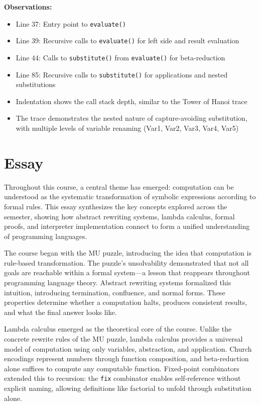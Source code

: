\documentclass{article}
\theoremstyle{theorem}
\theoremstyle{definition}
\theoremstyle{remark}
\begin{document}
\textbf{Observations:}

\begin{itemize}
\item Line 37: Entry point to \texttt{evaluate()}
\item Line 39: Recursive calls to \texttt{evaluate()} for left side and result evaluation
\item Line 44: Calls to \texttt{substitute()} from \texttt{evaluate()} for beta-reduction
\item Line 85: Recursive calls to \texttt{substitute()} for applications and nested substitutions
\item Indentation shows the call stack depth, similar to the Tower of Hanoi trace
\item The trace demonstrates the nested nature of capture-avoiding substitution, with multiple levels of variable renaming (Var1, Var2, Var3, Var4, Var5)
\end{itemize}

\section{Essay}

Throughout this course, a central theme has emerged: computation can be understood as the systematic transformation of symbolic expressions according to formal rules. This essay synthesizes the key concepts explored across the semester, showing how abstract rewriting systems, lambda calculus, formal proofs, and interpreter implementation connect to form a unified understanding of programming languages.

The course began with the MU puzzle, introducing the idea that computation is rule-based transformation. The puzzle's unsolvability demonstrated that not all goals are reachable within a formal system---a lesson that reappears throughout programming language theory. Abstract rewriting systems formalized this intuition, introducing termination, confluence, and normal forms. These properties determine whether a computation halts, produces consistent results, and what the final answer looks like.

Lambda calculus emerged as the theoretical core of the course. Unlike the concrete rewrite rules of the MU puzzle, lambda calculus provides a universal model of computation using only variables, abstraction, and application. Church encodings represent numbers through function composition, and beta-reduction alone suffices to compute any computable function. Fixed-point combinators extended this to recursion: the \texttt{fix} combinator enables self-reference without explicit naming, allowing definitions like factorial to unfold through substitution alone.
\end{document}
